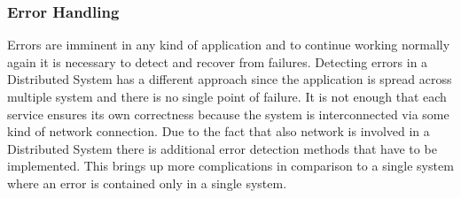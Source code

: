         \subsubsection{Error Handling}
        Errors are imminent in any kind of application and to continue working normally again it is necessary to detect and recover from failures.
        Detecting errors in a Distributed System has a different approach since the application is spread across multiple system and there is no 
        single point of failure. It is not enough that each service ensures its own correctness because the system is interconnected via some kind of
        network connection. Due to the fact that also network is involved in a Distributed System there is additional error detection methods that have
        to be implemented. This brings up more complications in comparison to a single system where an error is contained only in a single system.

         
